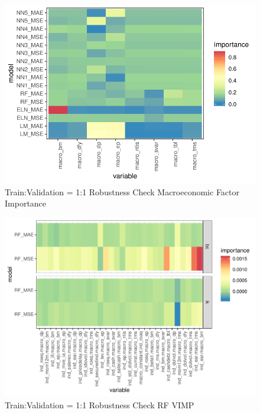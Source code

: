 \documentclass{article}
\begin{document}
\begin{figure}
	\includegraphics[]{../../Results/empirical_train_valid_1/empirical_sample_all_vi_macro.pdf}
	\caption{{Train:Validation = 1:1 Robustness Check Macroeconomic Factor Importance}}
\end{figure}


\begin{figure}
	\includegraphics[]{../../Results/empirical_train_valid_1/empirical_vimp.pdf}
	\caption{{Train:Validation = 1:1 Robustness Check RF VIMP}}
\end{figure}

\end{document}
